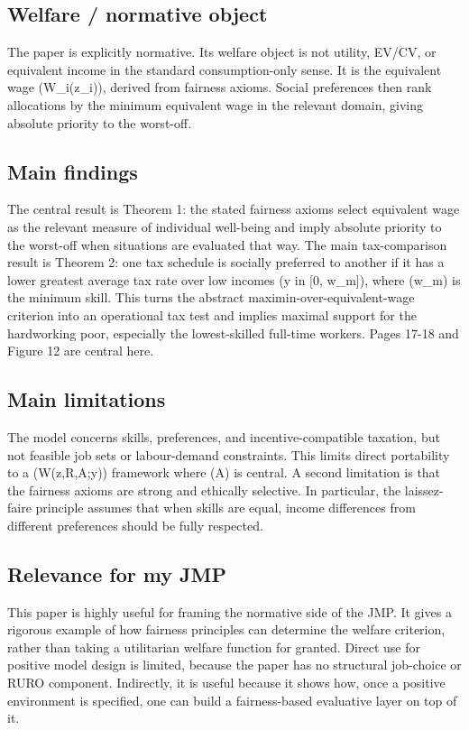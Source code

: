 \documentclass[11pt,a4paper]{article}
\begin{document}
\subsection*{Welfare / normative object}
The paper is explicitly normative. Its welfare object is not utility, EV/CV, or equivalent income in the standard consumption-only sense. It is the equivalent wage (W\_i(z\_i)), derived from fairness axioms. Social preferences then rank allocations by the minimum equivalent wage in the relevant domain, giving absolute priority to the worst-off.

\subsection*{Main findings}
The central result is Theorem 1: the stated fairness axioms select equivalent wage as the relevant measure of individual well-being and imply absolute priority to the worst-off when situations are evaluated that way. The main tax-comparison result is Theorem 2: one tax schedule is socially preferred to another if it has a lower greatest average tax rate over low incomes (y in [0, w\_m]), where (w\_m) is the minimum skill. This turns the abstract maximin-over-equivalent-wage criterion into an operational tax test and implies maximal support for the hardworking poor, especially the lowest-skilled full-time workers. Pages 17-18 and Figure 12 are central here.

\subsection*{Main limitations}
The model concerns skills, preferences, and incentive-compatible taxation, but not feasible job sets or labour-demand constraints. This limits direct portability to a (W(z,R,A;y)) framework where (A) is central. A second limitation is that the fairness axioms are strong and ethically selective. In particular, the laissez-faire principle assumes that when skills are equal, income differences from different preferences should be fully respected.

\subsection*{Relevance for my JMP}
This paper is highly useful for framing the normative side of the JMP. It gives a rigorous example of how fairness principles can determine the welfare criterion, rather than taking a utilitarian welfare function for granted. Direct use for positive model design is limited, because the paper has no structural job-choice or RURO component. Indirectly, it is useful because it shows how, once a positive environment is specified, one can build a fairness-based evaluative layer on top of it.
\end{document}
